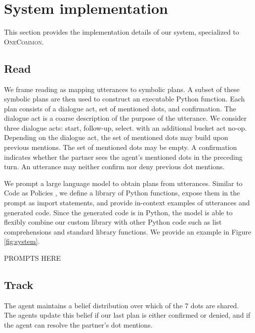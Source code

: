 \documentclass[11pt]{article}
\begin{document}

\section{System implementation}
\label{sec:implementation}
This section provides the implementation details of our system,
specialized to \textsc{OneCommon}.

\subsection{Read}
\label{sec:read}
We frame reading as mapping utterances to symbolic plans.
A subset of these symbolic plans are then used to construct an executable Python function.
Each plan consists of a dialogue act,
set of mentioned dots, and confirmation.
The dialogue act is a coarse description of the purpose of the utterance.
We consider three dialogue acts:
start, follow-up, select.
with an additional bucket act no-op.
Depending on the dialogue act,
the set of mentioned dots may build upon previous mentions.
The set of mentioned dots may be empty.
A confirmation indicates whether the partner sees the agent's mentioned dots
in the preceding turn.
An utterance may neither confirm nor deny previous dot mentions.

We prompt a large language model to obtain plans from utterances.
Similar to Code as Policies \citep{codeaspolicies2022},
we define a library of Python functions,
expose them in the prompt as import statements,
and provide in-context examples of utterances and generated code.
Since the generated code is in Python, the model is able to flexibly
combine our custom library with other Python code such as 
list comprehensions and standard library functions.
We provide an example in Figure \ref{fig:system}.

PROMPTS HERE

\subsection{Track}
\label{sec:track}
The agent maintains a belief distribution over which of the 7
dots are shared.
The agents update this belief if our last plan is either confirmed or denied,
and if the agent can resolve the partner's dot mentions.
\end{document}
